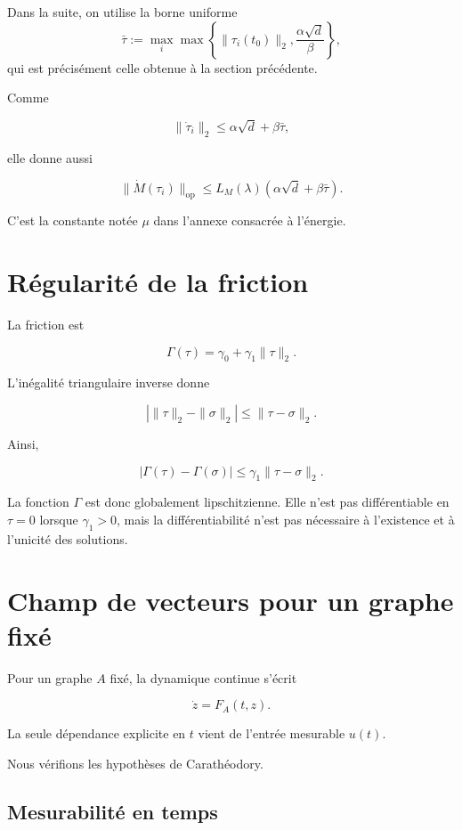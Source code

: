 Dans la suite, on utilise la borne uniforme
\[
\bar\tau
:=
\max_i\max\left\{\|\tau_i(t_0)\|_2,
\frac{\alpha\sqrt d}{\beta}\right\},
\]
qui est précisément celle obtenue à la section précédente.

Comme

\[
\|\dot\tau_i\|_2
\leq
\alpha\sqrt d+\beta\bar\tau,
\]

elle donne aussi

\[
\boxed{
\|\dot M(\tau_i)\|_{\mathrm{op}}
\leq
L_M(\lambda)
\left(
\alpha\sqrt d+\beta\bar\tau
\right).
}
\]

C'est la constante notée \(\mu\) dans l'annexe consacrée à l'énergie.

\section{Régularité de la friction}
\label{annexe-existence-friction}

La friction est

\[
\Gamma(\tau)
=
\gamma_0+\gamma_1\|\tau\|_2.
\]

L'inégalité triangulaire inverse donne

\[
\left|
\|\tau\|_2-\|\sigma\|_2
\right|
\leq
\|\tau-\sigma\|_2.
\]

Ainsi,

\[
\boxed{
|\Gamma(\tau)-\Gamma(\sigma)|
\leq
\gamma_1\|\tau-\sigma\|_2.
}
\]

La fonction \(\Gamma\) est donc globalement lipschitzienne. Elle n'est
pas différentiable en \(\tau=0\) lorsque \(\gamma_1>0\), mais la
différentiabilité n'est pas nécessaire à l'existence et à l'unicité
des solutions.

\section{Champ de vecteurs pour un graphe fixé}
\label{annexe-existence-champ}

Pour un graphe \(A\) fixé, la dynamique continue s'écrit

\[
\dot z=F_A(t,z).
\]

La seule dépendance explicite en \(t\) vient de l'entrée mesurable
\(u(t)\).

Nous vérifions les hypothèses de Carathéodory.

\subsection{Mesurabilité en temps}
\label{annexe-existence-mesurabilite}

